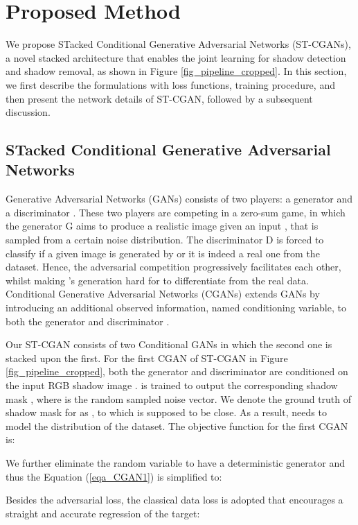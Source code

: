 \documentclass[10pt,twocolumn,letterpaper]{article}
\begin{document}
\section{Proposed Method}
We propose STacked Conditional Generative Adversarial Networks (ST-CGANs), a novel stacked architecture that enables the joint learning for shadow detection and shadow removal, as shown in Figure \ref{fig_pipeline_cropped}. In this section, we first describe the formulations with loss functions, training procedure, and then present the network details of ST-CGAN, followed by a subsequent discussion. 
\subsection{STacked Conditional Generative Adversarial Networks}
Generative Adversarial Networks (GANs) \cite{goodfellow2014generative} consists of two players: a generator  and a discriminator . These two players are competing in a zero-sum game, in which the generator G aims to produce a realistic image given an input , that is sampled from a certain noise distribution. The discriminator D is forced to classify if a given image is generated by  or it is indeed a real one from the dataset. Hence, the adversarial competition progressively facilitates each other, whilst making 's generation hard for  to differentiate from the real data. Conditional Generative Adversarial Networks (CGANs) \cite{mirza2014conditional} extends GANs by introducing an additional observed information, named conditioning variable, to both the generator  and discriminator . 

Our ST-CGAN consists of two Conditional GANs in which the second one is stacked upon the first.
For the first CGAN of ST-CGAN in Figure \ref{fig_pipeline_cropped}, both the generator  and discriminator  are conditioned on the input RGB shadow image .  is trained to output the corresponding shadow mask , where  is the random sampled noise vector. We denote the ground truth of shadow mask for  as , to which  is supposed to be close. As a result,  needs to model the distribution  of the dataset. The objective function for the first CGAN is:




We further eliminate the random variable  to have a deterministic generator  and thus the Equation (\ref{eqa_CGAN1}) is simplified to:


Besides the adversarial loss, the classical data loss is adopted that encourages a straight and accurate regression of the target:
\end{document}
